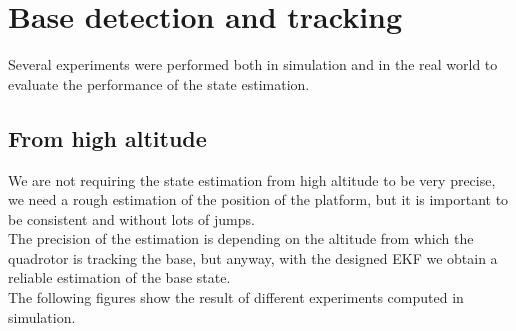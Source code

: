 \section{Base detection and tracking}
Several experiments were performed both in simulation and in the real world to evaluate the performance of the state estimation.
\subsection{From high altitude}
We are not requiring the state estimation from high altitude to be very precise, we need a rough estimation of the position of the platform, but it is important to be consistent and without lots of jumps.\\
The precision of the estimation is depending on the altitude from which the quadrotor is tracking the base, but anyway, with the designed  EKF we obtain a reliable estimation of the base state.\\
The following figures show the result of different experiments computed in simulation.

